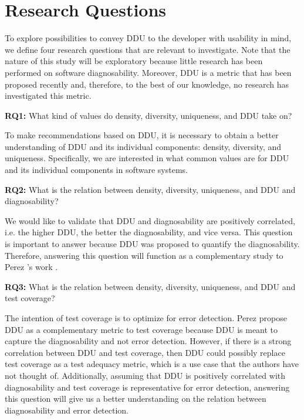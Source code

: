 \documentclass[twoside,a4paper,11pt]{memoir}
\begin{document}
\chapter{Research Questions}
\label{ch:research_questions}
To explore possibilities to convey DDU to the developer with usability in mind, we define four research questions that are relevant to investigate.
Note that the nature of this study will be exploratory because little research has been performed on software diagnosability.
Moreover, DDU is a metric that has been proposed recently \cite{DBLP:conf/icse/PerezAD17} and, therefore, to the best of our knowledge, no research has investigated this metric.

\begin{framed}
\noindent
\textbf{RQ1:} What kind of values do density, diversity, uniqueness, and DDU take on?
\end{framed}

To make recommendations based on DDU, it is necessary to obtain a better understanding of DDU and its individual components: density, diversity, and uniqueness.
Specifically, we are interested in what common values are for DDU and its individual components in software systems.

\begin{framed}
\noindent
\textbf{RQ2:} What is the relation between density, diversity, uniqueness, and DDU and diagnosability?
\end{framed}

We would like to validate that DDU and diagnosability are positively correlated, i.e. the higher DDU, the better the diagnosability, and vice versa.
This question is important to answer because DDU was proposed to quantify the diagnosability.
Therefore, answering this question will function as a complementary study to Perez \etal's work \cite{DBLP:conf/icse/PerezAD17}.

\begin{framed}
\noindent
\textbf{RQ3:} What is the relation between density, diversity, uniqueness, and DDU and test coverage?
\end{framed}

The intention of test coverage is to optimize for error detection.
Perez \etal propose DDU as a complementary metric to test coverage \cite{DBLP:conf/icse/PerezAD17} because DDU is meant to capture the diagnosability and not error detection.
However, if there is a strong correlation between DDU and test coverage, then DDU could possibly replace test coverage as a test adequacy metric, which is a use case that the authors have not thought of.
Additionally, assuming that DDU is positively correlated with diagnosability and test coverage is representative for error detection, answering this question will give us a better understanding on the relation between diagnosability and error detection.
\end{document}
